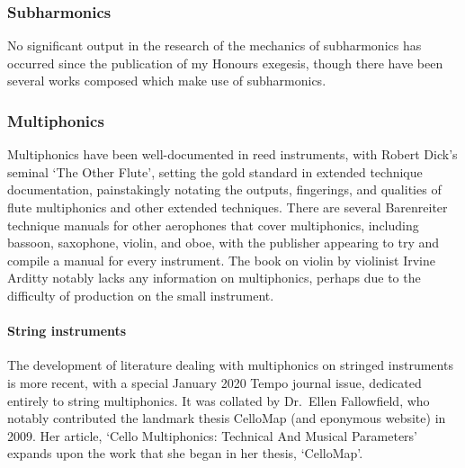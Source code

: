 \subsubsection{Subharmonics}
No significant output in the research of the mechanics of subharmonics has occurred since the publication of my Honours exegesis, though there have been several works composed which make use of subharmonics.\

\subsubsection{Multiphonics}
Multiphonics have been well-documented in reed instruments, with Robert Dick's seminal `The Other Flute', setting the gold standard in extended technique documentation, painstakingly notating the outputs, fingerings, and qualities of flute multiphonics and other extended techniques.\autocite{dickOtherFlute1989}
There are several Barenreiter technique manuals for other aerophones that cover multiphonics, including bassoon, saxophone, violin, and oboe, with the publisher appearing to try and compile a manual for every instrument.\autocite{weissTechniquesSaxophonePlaying2010,galloisTechniquesBassoonPlaying2009,ardittyTechniquesViolinPlaying2013}
The book on violin by violinist Irvine Arditty notably lacks any information on multiphonics, perhaps due to the difficulty of production on the small instrument.\autocite{ardittyTechniquesViolinPlaying2013}

\paragraph{String instruments}
The development of literature dealing with multiphonics on stringed instruments is more recent, with a special January 2020 Tempo journal issue, dedicated entirely to string multiphonics.
It was collated by Dr.\ Ellen Fallowfield, who notably contributed the landmark thesis CelloMap (and eponymous website) in 2009.\autocite{fallowfieldCelloMapHandbook2009, fallowfieldCelloMap}
Her article, `Cello Multiphonics: Technical And Musical Parameters' expands upon the work that she began in her thesis, `CelloMap'.\autocite{fallowfieldCelloMultiphonicsTechnical2020}

